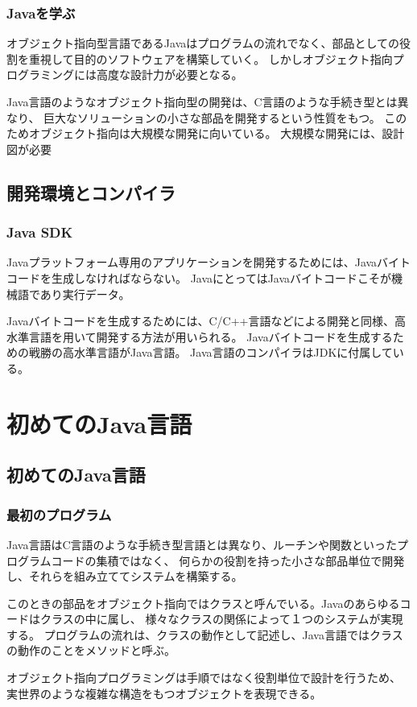 \documentclass[12pt,a4j,twoside]{jsbook}
\begin{document}
\subsection{Javaを学ぶ}
オブジェクト指向型言語であるJavaはプログラムの流れでなく、部品としての役割を重視して目的のソフトウェアを構築していく。
しかしオブジェクト指向プログラミングには高度な設計力が必要となる。

Java言語のようなオブジェクト指向型の開発は、C言語のような手続き型とは異なり、
巨大なソリューションの小さな部品を開発するという性質をもつ。
このためオブジェクト指向は大規模な開発に向いている。
大規模な開発には、設計図が必要

\section{開発環境とコンパイラ}
\subsection{Java SDK}
Javaプラットフォーム専用のアプリケーションを開発するためには、Javaバイトコードを生成しなければならない。
JavaにとってはJavaバイトコードこそが機械語であり実行データ。

Javaバイトコードを生成するためには、C/C++言語などによる開発と同様、高水準言語を用いて開発する方法が用いられる。
Javaバイトコードを生成するための戦勝の高水準言語がJava言語。
Java言語のコンパイラはJDKに付属している。
\chapter{初めてのJava言語}
\section{初めてのJava言語}
\subsection{最初のプログラム}
Java言語はC言語のような手続き型言語とは異なり、ルーチンや関数といったプログラムコードの集積ではなく、
何らかの役割を持った小さな部品単位で開発し、それらを組み立ててシステムを構築する。

このときの部品をオブジェクト指向ではクラスと呼んでいる。Javaのあらゆるコードはクラスの中に属し、
様々なクラスの関係によって１つのシステムが実現する。
プログラムの流れは、クラスの動作として記述し、Java言語ではクラスの動作のことをメソッドと呼ぶ。

オブジェクト指向プログラミングは手順ではなく役割単位で設計を行うため、
実世界のような複雑な構造をもつオブジェクトを表現できる。
\end{document}
